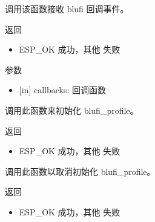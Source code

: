 \documentclass[a4paper,12pt,english]{sphinxmanual}
\begin{document}
{{\sphinxAtStartPar
调用该函数接收 blufi 回调事件。

\sphinxAtStartPar
返回
\begin{itemize}
\item {} 
\sphinxAtStartPar
ESP\_OK \sphinxhyphen{} 成功，其他 \sphinxhyphen{} 失败

\end{itemize}

\sphinxAtStartPar
参数
\begin{itemize}
\item {} 
\sphinxAtStartPar
{[}in{]} callbacks: 回调函数

\end{itemize}

\begin{sphinxVerbatim}[commandchars=\\\{\}]
\end{sphinxVerbatim}

\sphinxAtStartPar
调用此函数来初始化 blufi\_profile。

\sphinxAtStartPar
返回
\begin{itemize}
\item {} 
\sphinxAtStartPar
ESP\_OK \sphinxhyphen{} 成功，其他 \sphinxhyphen{} 失败

\end{itemize}

\begin{sphinxVerbatim}[commandchars=\\\{\}]
\end{sphinxVerbatim}

\sphinxAtStartPar
调用此函数以取消初始化 blufi\_profile。

\sphinxAtStartPar
返回
\begin{itemize}
\item {} 
\sphinxAtStartPar
ESP\_OK \sphinxhyphen{} 成功，其他 \sphinxhyphen{} 失败

\end{itemize}

\begin{sphinxVerbatim}[commandchars=\\\{\}]
\end{sphinxVerbatim}

}}
\end{document}
